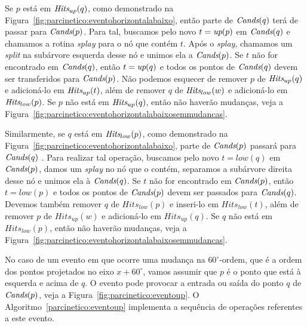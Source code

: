 Se $p$ está em $\textit{Hits}_{up}(q)$, como demonstrado na
Figura~\ref{fig:parcinetico:eventohorizontalabaixo}, então parte de $\textit{Cands}(q)$ terá de passar
para $\textit{Cands}(p)$.
Para tal, buscamos pelo novo $t = \textit{up}(p)$ em $\textit{Cands}(q)$ e chamamos a rotina \textit{splay} para o
nó que contém $t$.
Após o \textit{splay}, chamamos um \textit{split} na subárvore esquerda desse nó e unimos ela a
$\textit{Cands}(p)$.
Se $t$ não for encontrado em $\textit{Cands}(q)$, então $t = \textit{up}(q)$ e todos os pontos de $\textit{Cands}(q)$
devem ser transferidos para $\textit{Cands}(p)$.
Não podemos esquecer de remover $p$ de $\textit{Hits}_{up}(q)$ e adicioná-lo em $\textit{Hits}_{up}(t)$, além de
remover $q$ de $\textit{Hits}_{low}(w)$ e adicioná-lo em $\textit{Hits}_{low}(p)$.
Se $p$ não está em $\textit{Hits}_{up}(q)$, então não haverão mudanças, veja a
Figura~\ref{fig:parcinetico:eventohorizontalabaixosemmudancas}.



Similarmente, se $q$ está em $\textit{Hits}_{low}(p)$, como demonstrado na
Figura~\ref{fig:parcinetico:eventohorizontalabaixo}, parte de $\textit{Cands}(p)$ passará para $\textit{Cands}(q)$
.
Para realizar tal operação, buscamos pelo novo $t = low(q)$ em $\textit{Cands}(p)$, damos um \textit{splay}
no nó que o contém, separamos a subárvore direita desse nó e unimos ela à $\textit{Cands}(q)$.
Se $t$ não for encontrado em $\textit{Cands}(p)$, então $t = low(p)$ e todos os pontos de $\textit{Cands}(p)$ devem
ser passados para $\textit{Cands}(q)$.
Devemos também remover $q$ de $Hits_{low}(p)$ e inseri-lo em $Hits_{low}(t)$, além de remover $p$
de $Hits_{up}(w)$ e adicioná-lo em $Hits_{up}(q)$.
Se $q$ não está em $Hits_{low}(p)$, então não haverão mudanças, veja a
Figura~\ref{fig:parcinetico:eventohorizontalabaixosemmudancas}.



No caso de um evento em que ocorre uma mudança na $60^\circ$-ordem, que é a ordem dos pontos
projetados no eixo $x + 60^\circ$, vamos assumir que $p$ é o ponto que está à esquerda e acima de $q$.
O evento pode provocar a entrada ou saída do ponto $q$ de $\textit{Cands}(p)$, veja a
Figura~\ref{fig:parcinetico:eventoup}.
O Algoritmo~\ref{parcinetico:eventoup} implementa a sequência de operações referentes a este
evento.

